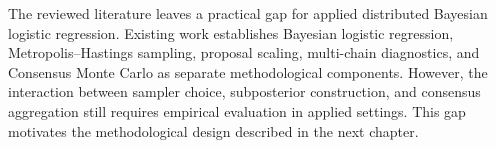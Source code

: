 The reviewed literature leaves a practical gap for applied distributed Bayesian logistic regression. Existing work establishes Bayesian logistic regression, Metropolis--Hastings sampling, proposal scaling, multi-chain diagnostics, and Consensus Monte Carlo as separate methodological components. However, the interaction between sampler choice, subposterior construction, and consensus aggregation still requires empirical evaluation in applied settings. This gap motivates the methodological design described in the next chapter.
